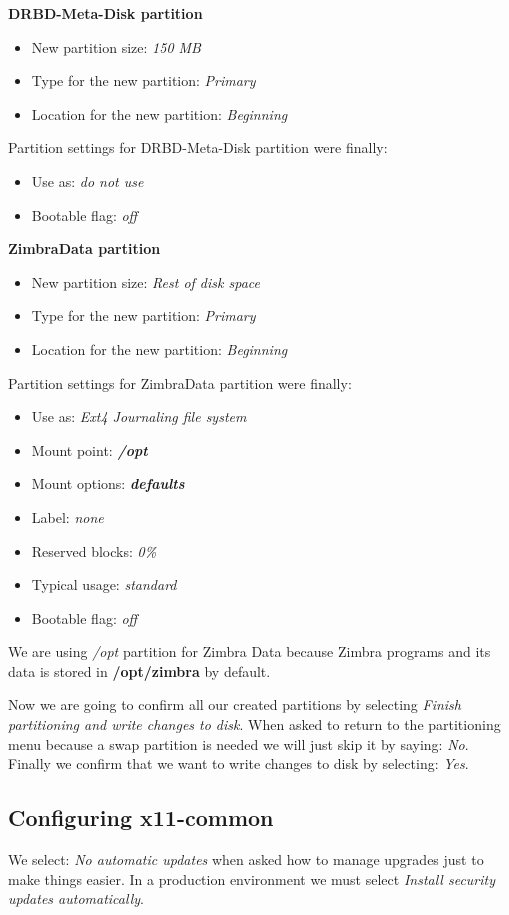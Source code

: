 \textbf{DRBD-Meta-Disk partition}
\begin{itemize}
  \item New partition size: \textit{150 MB}
  \item Type for the new partition: \textit {Primary}
  \item Location for the new partition: \textit{Beginning}
\end{itemize}
Partition settings for DRBD-Meta-Disk partition were finally:
\begin{itemize}
  \item Use as: \textit{do not use}
  \item Bootable flag: \textit{off}
\end{itemize}

\textbf{ZimbraData partition}
\begin{itemize}
  \item New partition size: \textit{Rest of disk space}
  \item Type for the new partition: \textit {Primary}
  \item Location for the new partition: \textit{Beginning}
\end{itemize}
Partition settings for ZimbraData partition were finally:
\begin{itemize}
  \item Use as: \textit{Ext4 Journaling file system}
  \item Mount point: \textbf{\textit{/opt}}
  \item Mount options: \textbf{\textit{defaults}}
  \item Label:	\textit{none}
  \item Reserved blocks: \textit{0\%}
  \item Typical usage: \textit{standard}
  \item Bootable flag: \textit{off}
\end{itemize}
We are using \textit{/opt} partition for Zimbra Data because Zimbra programs and its data is stored in \textbf{/opt/zimbra} by default.

Now we are going to confirm all our created partitions by selecting \textit{Finish partitioning and write changes to disk}.
When asked to return to the partitioning menu because a swap partition is needed we will just skip it by saying: \textit{No}. Finally we confirm that we want to write changes to disk by selecting: \textit{Yes}.

\subsection {Configuring x11-common}
We select: \textit{No automatic updates} when asked how to manage upgrades just to make things easier. In a production environment we must select \textit{Install security updates automatically}.

